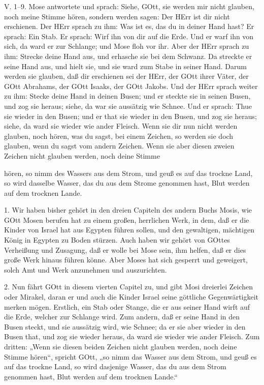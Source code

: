 \begin{schriftzitat}
V. 1–9. Mose antwortete und sprach: Siehe, GOtt, sie werden mir nicht glauben, noch meine Stimme hören, sondern werden sagen: Der HErr ist dir nicht erschienen. Der HErr sprach zu ihm: Was ist es, das du in deiner Hand hast? Er sprach: Ein Stab. Er sprach: Wirf ihn von dir auf die Erde. Und er warf ihn von sich, da ward er zur Schlange; und Mose floh vor ihr. Aber der HErr sprach zu ihm: Strecke deine Hand aus, und erhasche sie bei dem Schwanz. Da streckte er seine Hand aus, und hielt sie, und sie ward zum Stabe in seiner Hand. Darum werden sie glauben, daß dir erschienen sei der HErr, der GOtt ihrer Väter, der GOtt Abrahams, der GOtt Isaaks, der GOtt Jakobs. Und der HErr sprach weiter zu ihm: Stecke deine Hand in deinen Busen; und er steckte sie in seinen Busen, und zog sie heraus; siehe, da war sie aussätzig wie Schnee. Und er sprach: Thue sie wieder in den Busen; und er that sie wieder in den Busen, und zog sie heraus; siehe, da ward sie wieder wie ander Fleisch. Wenn sie dir nun nicht werden glauben, noch hören, was du sagst, bei einem Zeichen, so werden sie doch glauben, wenn du sagst vom andern Zeichen. Wenn sie aber diesen zweien Zeichen nicht glauben werden, noch deine Stimme
\end{schriftzitat}

hören, so nimm des Wassers aus dem Strom, und geuß es auf das trockne Land, so wird dasselbe Wasser, das du aus dem Strome genommen hast, Blut werden auf dem trocknen Lande.

1. Wir haben bisher gehört in den dreien Capiteln des andern Buchs Mosis, wie GOtt Mosen berufen hat zu einem großen, herrlichen Werk, in dem, daß er die Kinder von Israel hat aus Egypten führen sollen, und den gewaltigen, mächtigen König in Egypten zu Boden stürzen. Auch haben wir gehört von GOttes Verheißung und Zusagung, daß er wolle bei Mose sein, ihm helfen, daß er dies große Werk hinaus führen könne. Aber Moses hat sich gesperrt und geweigert, solch Amt und Werk anzunehmen und auszurichten.

2. Nun fährt GOtt in diesem vierten Capitel zu, und gibt Mosi dreierlei Zeichen oder Mirakel, daran er und auch die Kinder Israel seine göttliche Gegenwärtigkeit merken mögen. Erstlich, ein Stab oder Stange, die er aus seiner Hand wirft auf die Erde, welcher zur Schlange wird. Zum andern, daß er seine Hand in den Busen steckt, und sie aussätzig wird, wie Schnee; da er sie aber wieder in den Busen that, und zog sie wieder heraus, da ward sie wieder wie ander Fleisch. Zum dritten: „Wenn sie diesen beiden Zeichen nicht glauben werden, noch deine Stimme hören“, spricht GOtt, „so nimm das Wasser aus dem Strom, und geuß es auf das trockne Land, so wird dasjenige Wasser, das du aus dem Strom genommen hast, Blut werden auf dem trocknen Lande.“

